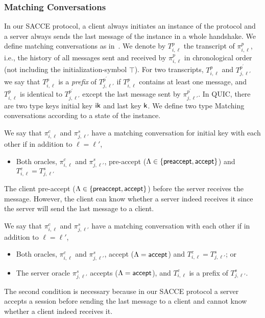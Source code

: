 \subsubsection{Matching Conversations}
In our SACCE protocol, a client always initiates an
instance of the protocol and a server always sends the
last message of the instance in a whole handshake.
We define matching conversations as in~\cite{JKSS12:ACCE}.
We denote by $T^p_{i,\ell}$ the transcript of
$\pi^p_{i,\ell}$, i.e., the history of all messages sent
and received by $\pi^p_{i,\ell}$ in chronological order
(not including the initialization-symbol $\top$).
For two transcripts, $T^p_{i,\ell}$ and
$T^{p^{\prime}}_{j,\ell'}$ we say that $T^p_{i,\ell}$
is a \textit{prefix} of $T^{p^{\prime}}_{j,\ell'}$ if
$T^p_{i,\ell}$ contains at least one message, and
$T^p_{i,\ell}$ is identical to
$T^{p^{\prime}}_{j,\ell'}$ except the last message sent
by $\pi^{p^{\prime}}_{j,\ell'}$.
In QUIC, there are two type keys initial key $\mathsf{ik}$ and
last key $\mathsf{k}$.
We define two type Matching conversations according to
a state of the instance.

\begin{definition}
 We say that $\pi^c_{i,\ell}$ and $\pi^s_{j,\ell'}$ have
 a matching conversation for initial key with each other if
 in addition to $\ell=\ell'$,
 \begin{itemize}
  \item{Both oracles, $\pi^c_{i, \ell}$ and
  $\pi^s_{j,\ell'}$, pre-accept ($\Lambda \in \{\mathsf{preaccept}, \mathsf{accept} \}$) and
  $T^c_{i,\ell} = T^s_{j,\ell'}$}
 \end{itemize}
\end{definition}
\begin{remark}
 The client pre-accept ($\Lambda \in \{\mathsf{preaccept}, \mathsf{accept} \}$) before the
 server receives the message. However, the client can know whether
 a server indeed receives it since the server will send the
 last message to a client.
\end{remark}
\begin{definition}
 We say that $\pi^c_{i,\ell}$ and $\pi^s_{j,\ell'}$ have
 a matching conversation with each other if in addition
 to $\ell=\ell'$,
 \begin{itemize}
  \item{Both oracles, $\pi^c_{i, \ell}$ and
  $\pi^s_{j,\ell'}$, accept ($\Lambda = \mathsf{accept}$) and
  $T^c_{i,\ell} = T^s_{j,\ell'}$; or}

  \item{The server oracle $\pi^s_{j, \ell'}$ accepts
  ($\Lambda = \mathsf{accept}$),
  and $T^c_{i,\ell}$ is a prefix of $T^s_{j,\ell'}$.}
 \end{itemize}
\end{definition}
\begin{remark}
 The second condition is necessary because in our SACCE
 protocol a server accepts a session before sending the
 last message to a client and cannot know whether a
 client indeed receives it.
\end{remark}

